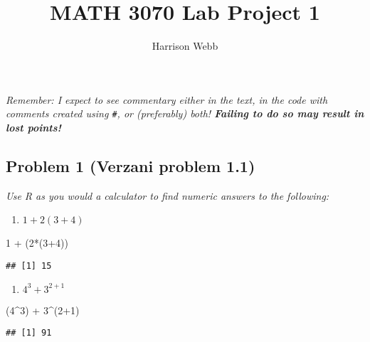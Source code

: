 \documentclass[
]{article}
\title{MATH 3070 Lab Project 1}
\author{Harrison Webb}
\date{}
\newenvironment{Shaded}{\begin{snugshade}}{\end{snugshade}}
\newcommand{\DecValTok}[1]{\textcolor[rgb]{0.00,0.00,0.81}{#1}}
\newcommand{\NormalTok}[1]{#1}
\newcommand{\SpecialCharTok}[1]{\textcolor[rgb]{0.00,0.00,0.00}{#1}}
\providecommand{\tightlist}{%
  \setlength{\itemsep}{0pt}\setlength{\parskip}{0pt}}
\begin{document}
\maketitle

{
\setcounter{tocdepth}{2}
\tableofcontents
}
\emph{Remember: I expect to see commentary either in the text, in the
code with comments created using \texttt{\#}, or (preferably) both!
\textbf{Failing to do so may result in lost points!}}

\hypertarget{problem-1-verzani-problem-1.1}{%
\subsection{Problem 1 (Verzani problem
1.1)}\label{problem-1-verzani-problem-1.1}}

\emph{Use R as you would a calculator to find numeric answers to the
following:}

\begin{enumerate}
\def\labelenumi{\arabic{enumi}.}
\tightlist
\item
  \(1 + 2(3 + 4)\)
\end{enumerate}

\begin{Shaded}
\begin{Highlighting}[]
\DecValTok{1} \SpecialCharTok{+}\NormalTok{ (}\DecValTok{2}\SpecialCharTok{*}\NormalTok{(}\DecValTok{3}\SpecialCharTok{+}\DecValTok{4}\NormalTok{))}
\end{Highlighting}
\end{Shaded}

\begin{verbatim}
## [1] 15
\end{verbatim}

\begin{enumerate}
\def\labelenumi{\arabic{enumi}.}
\setcounter{enumi}{1}
\tightlist
\item
  \(4^3 + 3^{2 + 1}\)
\end{enumerate}

\begin{Shaded}
\begin{Highlighting}[]
\NormalTok{(}\DecValTok{4}\SpecialCharTok{\^{}}\DecValTok{3}\NormalTok{) }\SpecialCharTok{+} \DecValTok{3}\SpecialCharTok{\^{}}\NormalTok{(}\DecValTok{2}\SpecialCharTok{+}\DecValTok{1}\NormalTok{)}
\end{Highlighting}
\end{Shaded}

\begin{verbatim}
## [1] 91
\end{verbatim}
\end{document}
